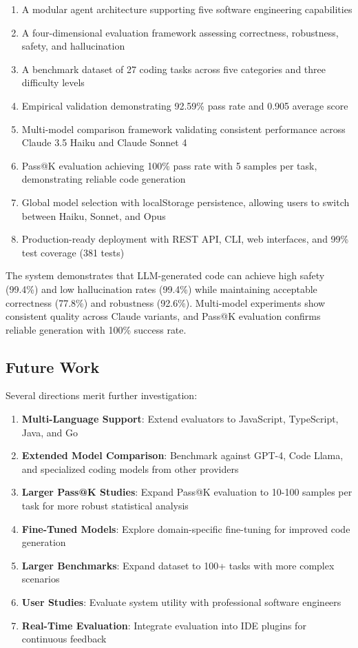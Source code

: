 \documentclass[12pt,a4paper]{article}
\begin{document}
\begin{enumerate}
    \item A modular agent architecture supporting five software engineering capabilities
    \item A four-dimensional evaluation framework assessing correctness, robustness, safety, and hallucination
    \item A benchmark dataset of 27 coding tasks across five categories and three difficulty levels
    \item Empirical validation demonstrating 92.59\% pass rate and 0.905 average score
    \item Multi-model comparison framework validating consistent performance across Claude 3.5 Haiku and Claude Sonnet 4
    \item Pass@K evaluation achieving 100\% pass rate with 5 samples per task, demonstrating reliable code generation
    \item Global model selection with localStorage persistence, allowing users to switch between Haiku, Sonnet, and Opus
    \item Production-ready deployment with REST API, CLI, web interfaces, and 99\% test coverage (381 tests)
\end{enumerate}

The system demonstrates that LLM-generated code can achieve high safety (99.4\%) and low hallucination rates (99.4\%) while maintaining acceptable correctness (77.8\%) and robustness (92.6\%). Multi-model experiments show consistent quality across Claude variants, and Pass@K evaluation confirms reliable generation with 100\% success rate.

\subsection{Future Work}

Several directions merit further investigation:

\begin{enumerate}
    \item \textbf{Multi-Language Support}: Extend evaluators to JavaScript, TypeScript, Java, and Go
    \item \textbf{Extended Model Comparison}: Benchmark against GPT-4, Code Llama, and specialized coding models from other providers
    \item \textbf{Larger Pass@K Studies}: Expand Pass@K evaluation to 10-100 samples per task for more robust statistical analysis
    \item \textbf{Fine-Tuned Models}: Explore domain-specific fine-tuning for improved code generation
    \item \textbf{Larger Benchmarks}: Expand dataset to 100+ tasks with more complex scenarios
    \item \textbf{User Studies}: Evaluate system utility with professional software engineers
    \item \textbf{Real-Time Evaluation}: Integrate evaluation into IDE plugins for continuous feedback
\end{enumerate}
\end{document}
